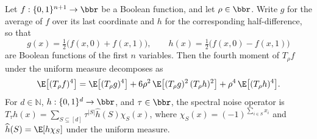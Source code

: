 \begin{lemma}
\leanok
{}
\label{BooleanAnalysis.Hypercontractivity.fourth_moment_noise_decomp}
Let $f:\{0,1\}^{n+1}\to\bbr$ be a Boolean function, and let $\rho\in\bbr$. Write $g$ for
the average of $f$ over its last coordinate and $h$ for the corresponding
half-difference, so that
\[
  g(x)=\tfrac12\bigl(f(x,0)+f(x,1)\bigr),\qquad
  h(x)=\tfrac12\bigl(f(x,0)-f(x,1)\bigr)
\]
are Boolean functions of the first $n$ variables. Then the fourth moment of $T_\rho f$
under the uniform measure decomposes as
\[
  \E\bigl[(T_\rho f)^4\bigr]
  = \E\bigl[(T_\rho g)^4\bigr]
  + 6\rho^2\,\E\bigl[(T_\rho g)^2\,(T_\rho h)^2\bigr]
  + \rho^4\,\E\bigl[(T_\rho h)^4\bigr].
\] For $d\in\mathbb N$, $h:\{0,1\}^d\to\bbr$, and $\tau\in\bbr$, the spectral noise
operator is $T_\tau h(x)=\sum_{S\subseteq[d]}\tau^{|S|}\widehat h(S)\chi_S(x)$, where
$\chi_S(x)=(-1)^{\sum_{i\in S}x_i}$ and $\widehat h(S)=\E[h\chi_S]$ under the uniform
measure.
\end{lemma}

